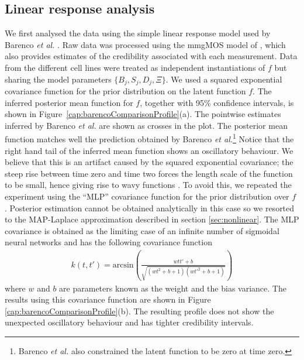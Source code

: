 \documentclass[english]{article}
\begin{document}
\subsection{Linear response analysis}
We first analysed the data using the simple linear response model used by 
Barenco \emph{et al.} \cite{Barenco:ranked06}. Raw data was processed using
the mmgMOS model of \cite{Liu:mmgMOS05}, which also provides estimates of the
credibility associated with each measurement. Data from the different cell
lines were treated as independent instantiations of $f$ but sharing the
model parameters $\{B_j,S_j,D_j,\Xi\}$.
We used a squared exponential 
covariance function for the 
prior distribution on the latent function $f$.
The inferred posterior mean function for $f$, together with 95\% confidence 
intervals, is shown in Figure~\ref{cap:barencoComparisonProfile}(a). 
The pointwise
estimates inferred by Barenco \emph{et al.} are shown as crosses in the
plot. The posterior mean function matches well the prediction obtained by
Barenco \emph{et al.}\footnote{Barenco \emph{et al.} also constrained the
latent function to be zero at time zero.} Notice that the right hand tail of
the inferred mean function shows an oscillatory behaviour. We believe that
this is an 
artifact caused by the squared exponential covariance; the steep rise between 
time zero and time two forces the length scale of the function 
to be small, hence giving rise to
wavy functions \cite[see page 123 in][]{Rasmussen:book05}.
To avoid this, we repeated the experiment using the ``MLP'' covariance function
for the prior distribution over $f$ \cite{Williams:computation98}. Posterior
estimation cannot be obtained analytically in this case so we resorted to the
MAP-Laplace approximation described in section \ref{sec:nonlinear}.
The MLP covariance is obtained as the 
limiting case of an infinite number of sigmoidal neural networks and has the 
following covariance function\begin{equation}
\begin{split}
k\left(t,t'\right)=
\textrm{arcsin}\left(\frac{w t t'+b}
{\sqrt{\left(w t^2+b+1\right)
\left(w t'^2+b+1\right)}}\right)
\end{split}\end{equation}
where $w$ and $b$ are parameters known as the weight and
the bias variance. 
The results using this covariance function are shown in Figure 
\ref{cap:barencoComparisonProfile}(b). The resulting profile does not show
the unexpected oscillatory behaviour and has tighter credibility intervals.
\end{document}
